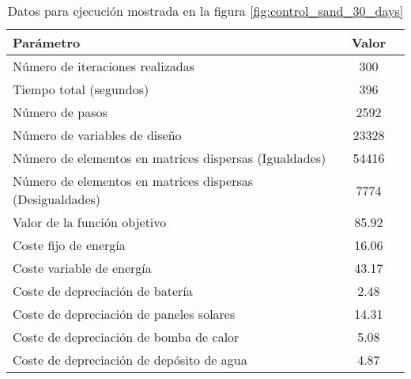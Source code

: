\begin{table}[ht]
	\centering
	\caption{Datos para ejecución mostrada en la figura \ref{fig:control_sand_30_days}}
	\label{tab:control_sand_30_days}
	\begin{tabular}{@{}lcc@{}}
		\toprule
		Parámetro                                                 & Valor \\
		\midrule
		Número de iteraciones realizadas                          & 300   \\
		Tiempo total (segundos)                                   & 396   \\
		Número de pasos                                           & 2592  \\
		Número de variables de diseño                             & 23328 \\
		Número de elementos en matrices dispersas (Igualdades)    & 54416 \\
		Número de elementos en matrices dispersas (Desigualdades) & 7774  \\
		\midrule
		Valor de la función objetivo                              & 85.92 \\
		\midrule
		Coste fijo de energía                                     & 16.06 \\
		Coste variable de energía                                 & 43.17 \\
		Coste de depreciación de batería                          & 2.48  \\
		Coste de depreciación de paneles solares                  & 14.31 \\
		Coste de depreciación de bomba de calor                   & 5.08  \\
		Coste de depreciación de depósito de agua                 & 4.87  \\
		\bottomrule
	\end{tabular}
\end{table}

